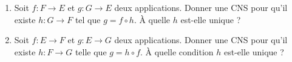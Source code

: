 \documentclass[a4paper,french,bookmarks]{article}
\begin{document}
    \begin{enumerate}
        \item Soit $f : F \to E$ et $g : G \to E$ deux applications. Donner une CNS pour qu'il existe $h : G \to F$ tel que $g = f \circ h$. À quelle $h$ est-elle unique ?

        \item Soit $f : E \to F$ et $g: E \to G$ deux applications. Donner une CNS pour qu'il existe $h: F \to G$ telle que $g = h \circ f$. À quelle condition $h$ est-elle unique ?
    \end{enumerate}

    
\end{document}
